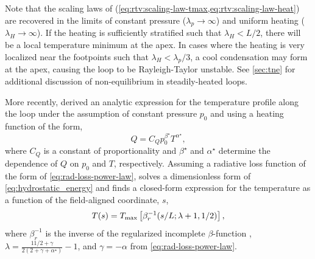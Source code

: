 Note that the scaling laws of \citet{rosner_dynamics_1978} (\cref{eq:rtv:scaling-law-tmax,eq:rtv:scaling-law-heat}) are recovered in the limits of constant pressure ($\lambda_p\to\infty$) and uniform heating ($\lambda_H\to\infty$). If the heating is sufficiently stratified such that $\lambda_H<L/2$, there will be a local temperature minimum at the apex. In cases where the heating is very localized near the footpoints such that $\lambda_H<\lambda_p/3$, a cool condensation may form at the apex, causing the loop to be Rayleigh-Taylor unstable. See \autoref{sec:tne} for additional discussion of non-equilibrium in steadily-heated loops.

More recently, \citet{martens_scaling_2010} derived an analytic expression for the temperature profile along the loop under the assumption of constant pressure $p_0$ and using a heating function of the form,
\begin{equation}\label{eq:martens:heating}
    Q = C_Qp_0^{\beta^\star}T^{\alpha^\star}, 
\end{equation}
where $C_Q$ is a constant of proportionality and $\beta^\star$ and $\alpha^\star$ determine the dependence of $Q$ on $p_0$ and $T$, respectively. Assuming a radiative loss function of the form of \autoref{eq:rad-loss-power-law}, \citeauthor{martens_scaling_2010} solves a dimensionless form of \autoref{eq:hydrostatic_energy} and finds a closed-form expression for the temperature as a function of the field-aligned coordinate, $s$,
\begin{equation}\label{eq:martens:temperature}
    T(s) = T_\textup{max}\left[\beta_r^{-1}(s/L;\lambda+1,1/2)\right],
\end{equation}
where $\beta_r^{-1}$ is the inverse of the regularized incomplete $\beta$-function \citep[see Section 6.6 of][]{abramowitz_handbook_1972}, $\lambda=\frac{11/2+\gamma}{2(2 + \gamma + \alpha^\star)} - 1$, and $\gamma = -\alpha$ from \autoref{eq:rad-loss-power-law}.


